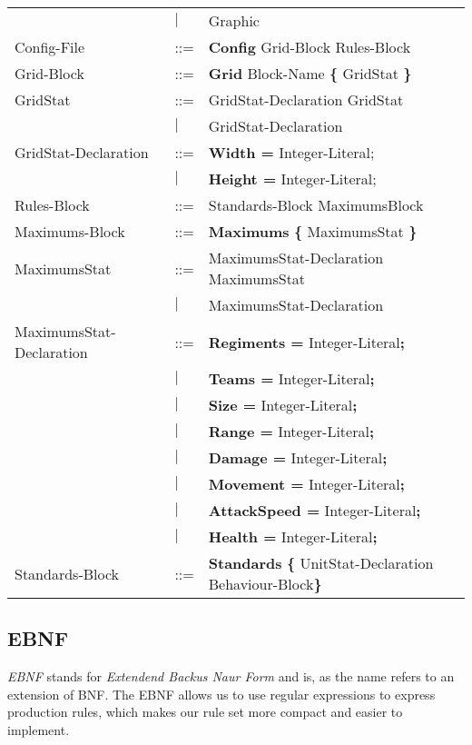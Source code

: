 \begin{center}
\begin{longtable}{l l l}
									&$\mid$	&Graphic\\
		Config-File					&	::=	&{\bf Config} Grid-Block Rules-Block\\
		Grid-Block					&	::=	&{\bf Grid} Block-Name	 {\bf \{} GridStat \bf{\}}\\
		GridStat					&	::=	&GridStat-Declaration GridStat\\
									&$\mid$	&GridStat-Declaration \\
		GridStat-Declaration		&	::=	&{\bf Width = } Integer-Literal;\\
									&$\mid$	&{\bf Height = } Integer-Literal;\\
		Rules-Block					&	::=	&Standards-Block MaximumsBlock\\
		Maximums-Block				&	::=	&{\bf Maximums} {\bf \{} MaximumsStat {\bf \}} \\
		MaximumsStat				&	::=	&MaximumsStat-Declaration MaximumsStat\\
									&$\mid$	&MaximumsStat-Declaration\\
		MaximumsStat-Declaration	&	::=	&{\bf Regiments = } Integer-Literal{\bf ;}\\
									&$\mid$	&{\bf Teams = } Integer-Literal{\bf ;}\\
									&$\mid$	&{\bf Size = } Integer-Literal{\bf ;}\\
									&$\mid$	&{\bf Range = } Integer-Literal{\bf ;}\\
									&$\mid$	&{\bf Damage = } Integer-Literal{\bf ;}\\
									&$\mid$	&{\bf Movement = } Integer-Literal{\bf ;}\\
									&$\mid$	&{\bf AttackSpeed = } Integer-Literal{\bf ;}\\
									&$\mid$	&{\bf Health = } Integer-Literal{\bf ;}\\
		Standards-Block				&	::=	&{\bf Standards} {\bf \{ } UnitStat-Declaration Behaviour-Block\bf{\} }\\
			\end{longtable}
		\end{center}
		
		
	\subsection{EBNF}
		{\it EBNF} stands for {\it Extendend Backus Naur Form} and is, as the name refers to an extension of BNF.
		The EBNF allows us to use regular expressions to express production rules, which makes our rule set more compact and 
		easier to implement.
	
